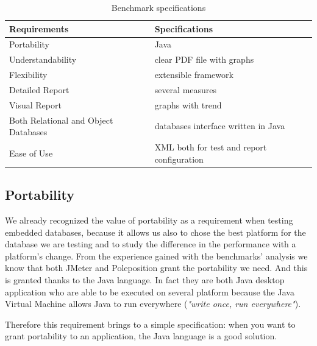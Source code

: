 \begin{table}[htp!]
	\centering
	\begin{tabular}{| p{6cm} | p{6cm} |} \hline
	
	\bfseries{Requirements} & \bfseries{Specifications} \\ \hline \hline
	
	Portability & Java \\ 
	\hline
	
	Understandability & clear PDF file with graphs \\
	\hline
	
	Flexibility & extensible framework  \\
	\hline
	
	Detailed Report & several measures \\
	\hline
	
	Visual Report & graphs with trend \\
	\hline
		
	Both Relational and Object Databases & databases interface written in Java \\
	\hline
	
	Ease of Use & XML both for test and report configuration\\
	\hline		
	
	\end{tabular}
	\caption{Benchmark specifications}
	\label{benchmark-specifications-table}
\end{table}


		\subsection{Portability}
We already recognized the value of portability as a requirement when testing embedded databases, because it allows us also to chose the best platform for the database we are testing and to study the difference in the performance with a platform's change. From the experience gained with the benchmarks' analysis we know that both JMeter and Poleposition grant the portability we need. And this is granted thanks to the Java language. In fact they are both Java desktop application who are able to be executed on several platform because the Java Virtual Machine allows Java to run everywhere (\emph{"write once, run everywhere"}).

Therefore this requirement brings to a simple specification: when you want to grant portability to an application, the Java language is a good solution. 
		
